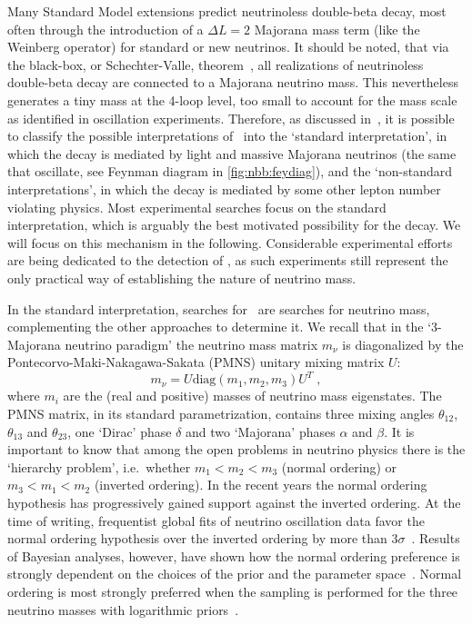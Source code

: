 Many Standard Model extensions predict neutrinoless double-beta decay, most
often through the introduction of a $\Delta L = 2$ Majorana mass term (like the
Weinberg operator) for standard or new neutrinos.  It should be noted, that via
the black-box, or Schechter-Valle, theorem~\cite{Schechter1982}, all
realizations of neutrinoless double-beta decay are connected to a Majorana
neutrino mass. This nevertheless generates a tiny mass at the 4-loop level, too
small to account for the mass scale as identified in oscillation experiments.
Therefore, as discussed in~\cite{Rodejohann2011}, it is possible to classify
the possible interpretations of \onbb\ into the `standard interpretation', in
which the decay is mediated by light and massive Majorana neutrinos (the same
that oscillate, see Feynman diagram in \cref{fig:nbb:feydiag}), and the
`non-standard interpretations', in which the decay is mediated by some other
lepton number violating physics. Most experimental searches focus on the
standard interpretation, which is arguably the best motivated possibility for
the decay. We will focus on this mechanism in the following.  Considerable
experimental efforts are being dedicated to the detection of \onbb, as such
experiments still represent the only practical way of establishing the nature
of neutrino mass.

In the standard interpretation, searches for \onbb\ are searches for neutrino
mass, complementing the other approaches to determine it. We recall that in the
`3-Majorana neutrino paradigm' the neutrino mass matrix $m_\nu$ is diagonalized
by the Pontecorvo-Maki-Nakagawa-Sakata (PMNS) unitary mixing matrix $U$:
\[
  m_\nu = U \text{diag}(m_1, m_2, m_3) U^T \;,
\]
where $m_i$ are the (real and positive) masses of neutrino mass eigenstates.
The PMNS matrix, in its standard parametrization, contains three mixing angles
$\theta_{12}$, $\theta_{13}$ and $\theta_{23}$, one `Dirac' phase $\delta$ and
two `Majorana' phases $\alpha$ and $\beta$. It is important to know that among
the open problems in neutrino physics there is the `hierarchy problem',
i.e.~whether $m_1 < m_2 < m_3$ (normal ordering) or $m_3 < m_1 < m_2$ (inverted
ordering).  In the recent years the normal ordering hypothesis has
progressively gained support against the inverted ordering. At the time of
writing, frequentist global fits of neutrino oscillation data favor the normal
ordering hypothesis over the inverted ordering by more than
$3\sigma$~\cite{Esteban2019}. Results of Bayesian analyses, however, have shown
how the normal ordering preference is strongly dependent on the choices of the
prior and the parameter space~\cite{Hannestad2016, Schwetz2017}.  Normal
ordering is most strongly preferred when the sampling is performed for the
three neutrino masses with logarithmic priors~\cite{Gariazzo2018}.

